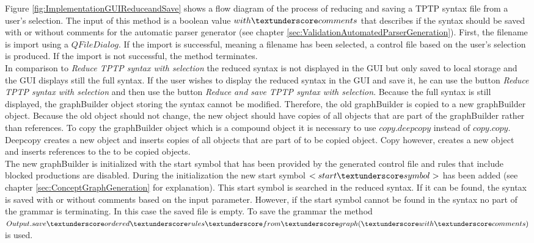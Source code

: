 Figure \ref{fig:ImplementationGUIReduceandSave} shows a flow diagram of the process of reducing and saving a \ac{TPTP} syntax file from a user's selection.
The input of this method is a boolean value $with\textunderscore comments$ that describes if the syntax should be saved with or without comments for the automatic parser generator (see chapter \ref{sec:ValidationAutomatedParserGeneration}). 
First, the filename is import using a $QFileDialog$.
If the import is successful, meaning a filename has been selected, a control file based on the user's selection is produced. If the import is not successful, the method terminates. \\
In comparison to \textit{Reduce \ac{TPTP} syntax with selection} the reduced syntax is not displayed in the GUI but only saved to local storage and the GUI displays still the full syntax. If the user wishes to display the reduced syntax in the GUI and save it, he can use the button \textit{Reduce \ac{TPTP} syntax with selection} and then use the button \textit{Reduce and save \ac{TPTP} syntax with selection}.
Because the full syntax is still displayed, the graphBuilder object storing the syntax cannot be modified. Therefore, the old graphBuilder is copied to a new graphBuilder object. Because the old object should not change, the new object should have copies of all objects that are part of the graphBuilder rather than references.
To copy the graphBuilder object which is a compound object it is necessary to use $copy.deepcopy$ instead of $copy.copy$. Deepcopy creates a new object and inserts copies of all objects that are part of to be copied object. Copy however, creates a new object and inserts references to the to be copied objects.\\
The new graphBuilder is initialized with the start symbol that has been provided by the generated control file and rules that include blocked productions are disabled. During the initialization the new start symbol $<start\textunderscore symbol>$ has been added (see chapter \ref{sec:ConceptGraphGeneration} for explanation).
This start symbol is searched in the reduced syntax.
If it can be found, the syntax is saved with or without comments based on the input parameter.
However, if the start symbol cannot be found in the syntax no part of the grammar is terminating.
In this case the saved file is empty.
To save the grammar the method $Output.save\textunderscore ordered\textunderscore rules\textunderscore from\textunderscore graph(\textunderscore with\textunderscore comments)$ is used.

